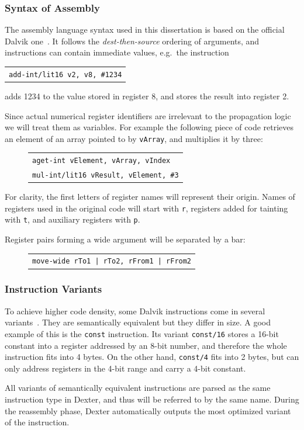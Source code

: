 \documentclass[12pt,twoside,notitlepage]{report}
\newcommand{\centerbox}[1] {
	\begin{center}
	\begin{footnotesize}
	\begin{tabular}{l}
	#1
	\end{tabular}
	\end{footnotesize}
	\end{center}
}
\newcommand{\asm}[1] {\texttt{#1}}
\begin{document}
\subsubsection{Syntax of Assembly}

The assembly language syntax used in this dissertation is based on the official Dalvik one~\cite{web:DalvikBytecode}. It follows the \emph{dest-then-source} ordering of arguments, and instructions can contain immediate values, e.g.\ the instruction
		\centerbox{
			\asm{add-int/lit16 v2, v8, \#1234}
		}
adds 1234 to the value stored in register 8, and stores the result into register 2. 

Since actual numerical register identifiers are irrelevant to the propagation logic we will treat them as variables. For example the following piece of code retrieves an element of an array pointed to by \verb$vArray$, and multiplies it by three:
	\begin{figure}[H]
		\centerbox{
			\asm{aget-int vElement, vArray, vIndex} \\
			\asm{mul-int/lit16 vResult, vElement, \#3}
		}
	\end{figure}

For clarity, the first letters of register names will represent their origin. Names of registers used in the original code will start with \verb$r$, registers added for tainting with \verb$t$, and auxiliary registers with \verb$p$.

Register pairs forming a wide argument will be separated by a bar:
	\begin{figure}[H]
		\centerbox{
			\asm{move-wide rTo1 | rTo2, rFrom1 | rFrom2}
		}
	\end{figure}

\subsubsection{Instruction Variants}

To achieve higher code density, some Dalvik instructions come in several variants~\cite{web:DalvikBytecode}. They are semantically equivalent but they differ in size. A good example of this is the \verb$const$ instruction. Its variant \verb$const/16$ stores a 16-bit constant into a register addressed by an 8-bit number, and therefore the whole instruction fits into 4 bytes. On the other hand, \verb$const/4$ fits into 2 bytes, but can only address registers in the 4-bit range and carry a 4-bit constant.

All variants of semantically equivalent instructions are parsed as the same instruction type in Dexter, and thus will be referred to by the same name. During the reassembly phase, Dexter automatically outputs the most optimized variant of the instruction.
\end{document}

